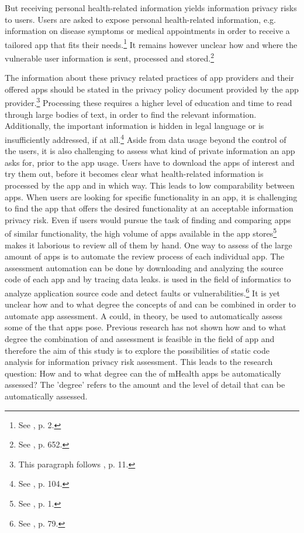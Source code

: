 \documentclass[
	a4paper,
	oneside,
	12pt,
	liststotocnumbered
]{article}
\let\cite\textcite
\begin{document}
But receiving personal health-related information yields information privacy risks to users.
Users are asked to expose personal health-related information, e.g. information on disease symptoms or medical appointments in order to receive a tailored app that fits their needs.\footnote{See \cite{Chen2012}, p. 2.}
It remains however unclear how and where the vulnerable user information is sent, processed and stored.\footnote{See \cite{He2014}, p. 652.}

The information about these privacy related practices of app providers and their offered apps should be stated in the privacy policy document provided by the app provider.\footnote{This paragraph follows \cite{Dehling2014}, p. 11.}
Processing these \pps requires a higher level of education and time to read through large bodies of text, in order to find the relevant information. 
Additionally, the important information is hidden in legal language or is  insufficiently addressed, if at all.\footnote{See \cite{Pollach2007}, p. 104.}
Aside from data usage beyond the control of the users, it is also challenging to assess what kind of private information an app asks for, prior to the app usage. 
Users have to download the apps of interest and try them out, before it becomes clear what health-related information is processed by the app and in which  way. 
This leads to low comparability between apps. 
When users are looking for specific functionality in an \mH app, it is challenging to find the app that offers the desired functionality at an acceptable information privacy risk. 
Even if users would pursue the task of finding and comparing \mH apps of similar functionality, the high volume of apps available in the app stores\footnote{See \cite{Enck2011}, p. 1.} makes it laborious to review all of them by hand.
One way to assess \ipr of the large amount of \mH apps is to automate the review process of each individual app. 
The assessment automation can be done by downloading and analyzing the source code of each app and by tracing data leaks. 
\Sca is used in the field of informatics to analyze application source code and detect faults or vulnerabilities.\footnote{See \cite{Baca2008}, p. 79.} 
It is yet unclear how and to what degree the concepts of \sca and \pra can be combined in order to automate app assessment.
A \sca could, in theory, be used to automatically assess some of the \ipr that \mH apps pose.
Previous research has not shown how and to what degree the combination of \sca and \ipr assessment is feasible in the field of \mH app \pra and therefore the aim of this study is to explore the possibilities of static code analysis for information privacy risk assessment. 
This leads to the research question: How and to what degree can the \ipr of mHealth apps be automatically assessed?
The 'degree' refers to the amount and the level of detail that \iprfs can be automatically assessed.
\end{document}
